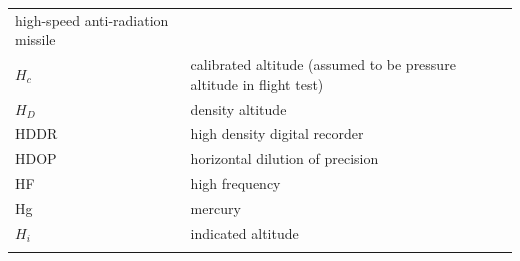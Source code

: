 \documentclass[
]{book}
\begin{document}
\begin{longtable}[]{@{}ll@{}}
\begin{minipage}[t]{0.47\columnwidth}
high-speed anti-radiation missile\strut
\end{minipage}\tabularnewline
\begin{minipage}[t]{0.47\columnwidth}\raggedright
\(H_c\)\strut
\end{minipage} & \begin{minipage}[t]{0.47\columnwidth}\raggedright
calibrated altitude (assumed to be pressure altitude in flight test)\strut
\end{minipage}\tabularnewline
\begin{minipage}[t]{0.47\columnwidth}\raggedright
\(H_D\)\strut
\end{minipage} & \begin{minipage}[t]{0.47\columnwidth}\raggedright
density altitude\strut
\end{minipage}\tabularnewline
\begin{minipage}[t]{0.47\columnwidth}\raggedright
HDDR\strut
\end{minipage} & \begin{minipage}[t]{0.47\columnwidth}\raggedright
high density digital recorder\strut
\end{minipage}\tabularnewline
\begin{minipage}[t]{0.47\columnwidth}\raggedright
HDOP\strut
\end{minipage} & \begin{minipage}[t]{0.47\columnwidth}\raggedright
horizontal dilution of precision\strut
\end{minipage}\tabularnewline
\begin{minipage}[t]{0.47\columnwidth}\raggedright
HF\strut
\end{minipage} & \begin{minipage}[t]{0.47\columnwidth}\raggedright
high frequency\strut
\end{minipage}\tabularnewline
\begin{minipage}[t]{0.47\columnwidth}\raggedright
Hg\strut
\end{minipage} & \begin{minipage}[t]{0.47\columnwidth}\raggedright
mercury\strut
\end{minipage}\tabularnewline
\begin{minipage}[t]{0.47\columnwidth}\raggedright
\(H_i\)\strut
\end{minipage} & \begin{minipage}[t]{0.47\columnwidth}\raggedright
indicated altitude\strut
\end{minipage}\tabularnewline
\begin{minipage}[t]{0.47\columnwidth}\raggedright

\end{minipage}
\end{longtable}
\end{document}
